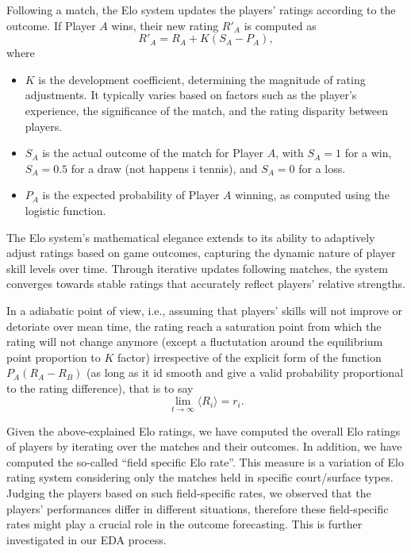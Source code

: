 \documentclass[preprint,aps,nofootinbib,a4paper,superscriptaddress,longbibliography,amsfonts,amssymb,amsmath,titlepage]{revtex4-2}
\begin{document}
Following a match, the Elo system updates the players' ratings according to the outcome. If Player $A$ wins, their new rating $R'_A$ is computed as
%
\begin{equation}
R'_A = R_A + K (S_A - P_A),
\end{equation}
%
where
%
\begin{itemize}
\item $K$ is the development coefficient, determining the magnitude of rating adjustments. It typically varies based on factors such as the player's experience, the significance of the match, and the rating disparity between players.
\item $S_A$ is the actual outcome of the match for Player $A$, with $S_A = 1$ for a win, $S_A = 0.5$ for a draw (not happens i tennis), and $S_A = 0$ for a loss.
\item $P_A$ is the expected probability of Player $A$ winning, as computed using the logistic function.
\end{itemize}
%
The Elo system's mathematical elegance extends to its ability to adaptively adjust ratings based on game outcomes, capturing the dynamic nature of player skill levels over time. Through iterative updates following matches, the system converges towards stable ratings that accurately reflect players' relative strengths.

In a adiabatic point of view, i.e., assuming that players' skills will not improve or detoriate over mean time, the rating reach a saturation point from which the rating will not change anymore (except a fluctutation around the equilibrium point proportion to $K$ factor) irrespective of the explicit form of the function $P_A (R_A - R_B)$ (as long as it id smooth and give a valid probability proportional to the rating difference), that is to say
%
\begin{equation}
\lim_{t \to \infty} \langle R_i \rangle = r_i.
\end{equation}
%

Given the above-explained Elo ratings, we have computed the overall Elo ratings of players by iterating over the matches and their outcomes. In addition, we have computed the so-called ``field specific Elo rate''. This measure is a variation of Elo rating system considering only the matches held in specific court/surface types. Judging the players based on such field-specific rates, we observed that the players' performances differ in different situations, therefore these field-specific rates might play a crucial role in the outcome forecasting. This is further investigated in our EDA process.
\end{document}
